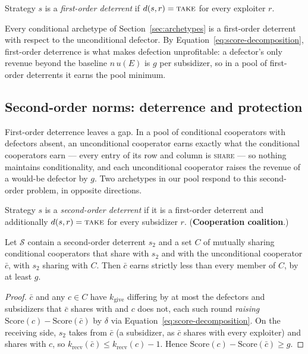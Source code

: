 \begin{definition}
Strategy $s$ is a \emph{first-order deterrent} if
$d(s, r) = \textup{\textsc{take}}$ for every exploiter $r$.
\end{definition}

Every conditional archetype of Section~\ref{sec:archetypes} is a
first-order deterrent with respect to the unconditional defector.
By Equation~\eqref{eq:score-decomposition}, first-order deterrence is
what makes defection unprofitable: a defector's only revenue beyond
the baseline $n\,u(E)$ is $g$ per subsidizer, so in a pool of
first-order deterrents it earns the pool minimum.

\subsection{Second-order norms: deterrence and protection}
\label{sec:second-order}

First-order deterrence leaves a gap.
In a pool of conditional cooperators with defectors absent, an
unconditional cooperator earns exactly what the conditional
cooperators earn --- every entry of its row and column is
\textup{\textsc{share}} --- so nothing maintains conditionality, and
each unconditional cooperator raises the revenue of a would-be
defector by $g$.
Two archetypes in our pool respond to this second-order problem, in
opposite directions.

\begin{definition}
Strategy $s$ is a \emph{second-order deterrent} if it is a
first-order deterrent and additionally
$d(s, r) = \textup{\textsc{take}}$ for every subsidizer $r$.
(\textbf{Cooperation coalition}.)
\end{definition}

\begin{proposition}
\label{prop:drift}
Let $\mathcal{S}$ contain a second-order deterrent $s_2$ and a set
$C$ of mutually sharing conditional cooperators that share with
$s_2$ and with the unconditional cooperator $\bar{c}$, with $s_2$
sharing with $C$.
Then $\bar{c}$ earns strictly less than every member of $C$, by at
least $g$.
\end{proposition}

\begin{proof}
$\bar{c}$ and any $c \in C$ have $k_{\mathrm{give}}$ differing by at
most the defectors and subsidizers that $\bar{c}$ shares with and $c$
does not, each such round \emph{raising}
$\mathrm{Score}(c) - \mathrm{Score}(\bar{c})$ by $\delta$ via
Equation~\eqref{eq:score-decomposition}.
On the receiving side, $s_2$ takes from $\bar{c}$ (a subsidizer, as
$\bar{c}$ shares with every exploiter) and shares with $c$, so
$k_{\mathrm{recv}}(\bar{c}) \le k_{\mathrm{recv}}(c) - 1$.
Hence
$\mathrm{Score}(c) - \mathrm{Score}(\bar{c}) \ge g$.
\end{proof}

